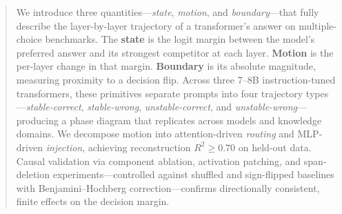 \documentclass{article}
\begin{document}

\printAffiliationsAndNotice{}

\makeatletter
\gdef\@icmltitlerunning{State, Motion, Boundary}
\makeatother

\begin{abstract}
We introduce three quantities---\emph{state}, \emph{motion}, and \emph{boundary}---that fully describe the layer-by-layer trajectory of a transformer's answer on multiple-choice benchmarks.
The \textbf{state} is the logit margin between the model's preferred answer and its strongest competitor at each layer.
\textbf{Motion} is the per-layer change in that margin.
\textbf{Boundary} is its absolute magnitude, measuring proximity to a decision flip.
Across three 7--8B instruction-tuned transformers, these primitives separate prompts into four trajectory types---\emph{stable-correct}, \emph{stable-wrong}, \emph{unstable-correct}, and \emph{unstable-wrong}---producing a phase diagram that replicates across models and knowledge domains.
We decompose motion into attention-driven \emph{routing} and MLP-driven \emph{injection}, achieving reconstruction $R^2 \geq 0.70$ on held-out data.
Causal validation via component ablation, activation patching, and span-deletion experiments---controlled against shuffled and sign-flipped baselines with Benjamini--Hochberg correction---confirms directionally consistent, finite effects on the decision margin.
\end{abstract}

\end{document}
